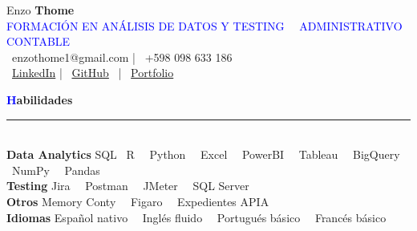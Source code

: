 \documentclass[a4paper,10pt]{article}
\begin{document}
\begin{spacing}{1.1}

\begin{center}
\begin{minipage}{0.2\textwidth}
\end{minipage}%
\begin{minipage}{0.78\textwidth}
\begin{center}
{\Huge  Enzo \textbf{Thome}} \\[2pt]
    \textcolor{blue}{FORMACIÓN EN ANÁLISIS DE DATOS Y TESTING \, \textbullet \, ADMINISTRATIVO CONTABLE} \\[2pt]
    \faEnvelope \, enzothome1@gmail.com | \faPhone \, +598 098 633 186 \\ 
    \faLinkedin \, \href{https://www.linkedin.com/in/enzo-thome-one/}{LinkedIn} | \faGithub \, \href{https://github.com/enzoth7}{GitHub} \, | \faGlobe \, \href{https://sites.google.com/view/enzo-thome}{Portfolio}
    \end{center}
\end{minipage}
\end{center}

\vspace{0.3cm}

\noindent
{\Large\textbf{\textcolor{blue}{H}abilidades}}
\hspace{0.3em}\rule[0.9ex]{\dimexpr\textwidth-9em}{0.4pt} \\[6pt]
\textbf{Data Analytics} \hfill SQL \textbullet \, R \, \textbullet \, Python \, \textbullet \, Excel \, \textbullet \, PowerBI \, \textbullet \, Tableau \, \textbullet \, BigQuery \, \textbullet \, NumPy \, \textbullet \, Pandas \\
\textbf{Testing} \hfill Jira \, \textbullet \, Postman \, \textbullet \, JMeter \, \textbullet \, SQL Server \\ 
\textbf{Otros} \hfill Memory Conty \, \textbullet \, Figaro \, \textbullet \, Expedientes APIA \\ 
\textbf{Idiomas} \hfill Español nativo \, \textbullet \, Inglés fluido \, \textbullet \, Portugués básico \, \textbullet \, Francés básico \\


\end{spacing}
\end{document}

